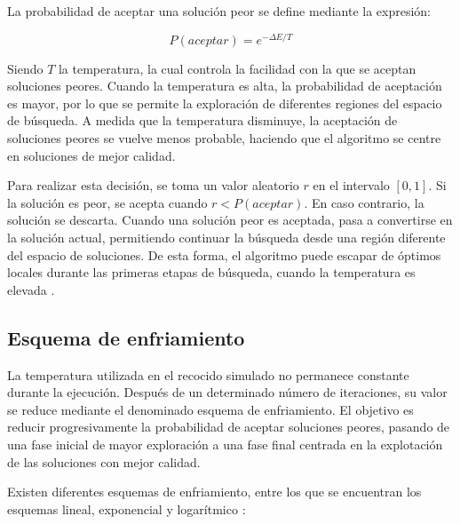 La probabilidad de aceptar una solución peor se define mediante la expresión:

\begin{equation}
  P(aceptar) = e^{-\Delta E / T}
\end{equation}

Siendo $T$ la temperatura, la cual controla la facilidad con la que se aceptan soluciones peores. Cuando la temperatura
es alta, la probabilidad de aceptación es mayor, por lo que se permite la exploración de diferentes regiones del espacio
de búsqueda. A medida que la temperatura disminuye, la aceptación de soluciones peores se vuelve menos probable, 
haciendo que el algoritmo se centre en soluciones de mejor calidad.

Para realizar esta decisión, se toma un valor aleatorio $r$ en el intervalo $[0, 1]$. Si la solución es peor, se acepta
cuando $r < P(aceptar)$. En caso contrario, la solución se descarta. Cuando una solución peor es aceptada, pasa a convertirse
en la solución actual, permitiendo continuar la búsqueda desde una región diferente del espacio de soluciones. De esta forma, 
el algoritmo puede escapar de óptimos locales durante las primeras etapas de búsqueda, cuando la temperatura es elevada
\cite{peralta2015}.

\subsection{Esquema de enfriamiento}
\label{subsec:cooling_scheme}

La temperatura utilizada en el recocido simulado no permanece constante durante la ejecución. Después de un determinado número
de iteraciones, su valor se reduce mediante el denominado esquema de enfriamiento. El objetivo es reducir progresivamente la 
probabilidad de aceptar soluciones peores, pasando de una fase inicial de mayor exploración a una fase final centrada en la 
explotación de las soluciones con mejor calidad.

Existen diferentes esquemas de enfriamiento, entre los que se encuentran los esquemas lineal, exponencial y logarítmico
\cite{nourani1998} \cite{property2026}:

